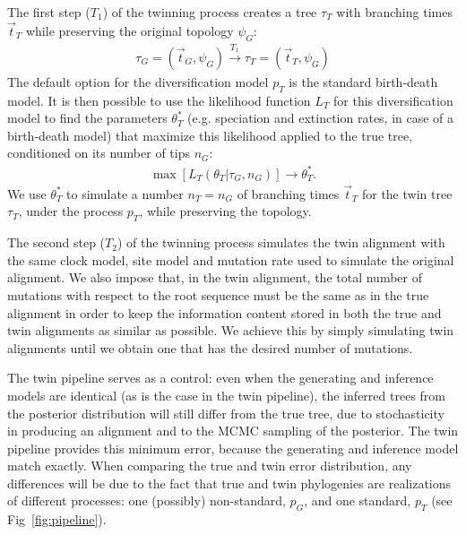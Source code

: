 The first step ($T_1$) of the twinning process creates a tree $\tau_{\mathit{T}}$
with branching times $\Vec{t}_{\mathit{T}}$ while preserving the original
topology $\psi_{\mathit{G}}$:
\begin{align}
  \tau_{\mathit{G}} = (\Vec{t}_{\mathit{G}}, \psi_{\mathit{G}}) 
  \xrightarrow[]{\mathit{T_1}} 
  \tau_{\mathit{T}} = (\Vec{t}_{\mathit{T}}, \psi_{\mathit{G}})
\end{align}
The default option for the diversification model $p_T$ is the standard birth-death model.
It is then possible to use the likelihood function 
$L_{\mathit{T}}$ for this diversification model to find the parameters $\theta^{*}_{\mathit{T}}$ 
(e.g. speciation and extinction rates, in case of a birth-death model) 
that maximize this likelihood applied 
to the true tree, conditioned on its number of tips $n_{\mathit{G}}$:
\begin{align}
    \max[L_{\mathit{T}}(\theta_{\mathit{T}}|\tau_{\mathit{G}}, n_{\mathit{G}})] 
\rightarrow \theta^{*}_{\mathit{T}}.
\end{align}
We use $\theta^{*}_{\mathit{T}}$ to simulate a number 
$n_{\mathit{T}} = n_{\mathit{G}}$ 
of branching times $\Vec{t}_{\mathit{T}}$ for the twin tree 
$\tau_{\mathit{T}}$, under the process $p_{T}$, 
while preserving the topology.

The second step ($T_2$) of the twinning process simulates the twin alignment 
with the same clock model, site model and mutation rate 
used to simulate the original alignment. 
We also impose that, in the twin alignment, 
the total number of mutations with respect to the root sequence 
must be the same as in the true alignment in order to keep the information content 
stored in both the true and twin alignments as similar as possible. We achieve this by simply simulating twin alignments until we
obtain one that has the desired number of mutations.

The twin pipeline serves as a control: 
even when the generating and inference models are identical
(as is the case in the twin pipeline),
the inferred trees from the posterior distribution will 
still differ from the true tree, 
due to stochasticity in producing an alignment 
and to the MCMC sampling of the posterior.
The twin pipeline provides this minimum error,
because the generating and inference model match exactly.
When comparing the true and twin error distribution,
any differences will be due to the fact that true and twin phylogenies are realizations 
of different processes: one (possibly) non-standard, $p_G$, 
and one standard, $p_T$ (see Fig~\ref{fig:pipeline}).

